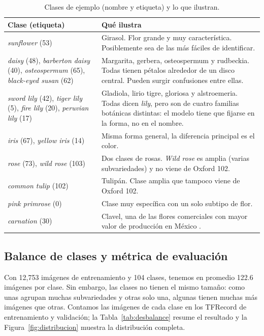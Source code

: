 \begin{table}[H]
\centering
\caption{Clases de ejemplo (nombre y etiqueta) y lo que ilustran.}
\label{tab:ejemplos}
\small
\begin{tabular}{p{}p{}}
\toprule
Clase (etiqueta) & Qué ilustra \\
\midrule
\textit{sunflower} (53) & Girasol. Flor grande y muy característica. Posiblemente sea de las más fáciles de identificar. \\
\textit{daisy} (48), \textit{barberton daisy} (40), \textit{osteospermum} (65), \textit{black-eyed susan} (62) & Margarita, gerbera, osteospermum y rudbeckia. Todas tienen pétalos alrededor de un disco central. Pueden surgir confusiones entre ellas. \\
\textit{sword lily} (42), \textit{tiger lily} (5), \textit{fire lily} (20), \textit{peruvian lily} (17) & Gladiola, lirio tigre, gloriosa y alstroemeria. Todas dicen \textit{lily}, pero son de cuatro familias botánicas distintas: el modelo tiene que fijarse en la forma, no en el nombre. \\
\textit{iris} (67), \textit{yellow iris} (14) & Misma forma general, la diferencia principal es el color. \\
\textit{rose} (73), \textit{wild rose} (103) & Dos clases de rosas. \textit{Wild rose} es amplia (varias subvariedades) y no viene de Oxford 102. \\
\textit{common tulip} (102) & Tulipán. Clase amplia que tampoco viene de Oxford 102. \\
\textit{pink primrose} (0) & Clase muy específica con un solo subtipo de flor. \\
\textit{carnation} (30) & Clavel, una de las flores comerciales con mayor valor de producción en México \parencite{siap2022}. \\
\bottomrule
\end{tabular}
\end{table}

\subsection{Balance de clases y métrica de evaluación}
\label{sec:balance}
Con 12,753 imágenes de entrenamiento y 104 clases, tenemos en promedio 122.6 imágenes por clase. Sin embargo, las clases no tienen el mismo tamaño: como unas agrupan muchas subvariedades y otras solo una, algunas tienen muchas más imágenes que otras. Contamos las imágenes de cada clase en los TFRecord de entrenamiento y validación; la Tabla~\ref{tab:desbalance} resume el resultado y la Figura~\ref{fig:distribucion} muestra la distribución completa.

